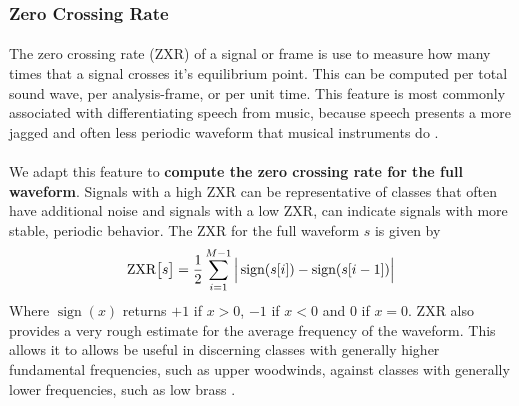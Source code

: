 \documentclass[12pt,letterpaper]{article}
\DeclareMathOperator{\sign}{\text{sign}}
\begin{document}

\subsubsection{Zero Crossing Rate}

\paragraph*{}The zero crossing rate (ZXR) of a signal or frame is use to measure how many times that a signal crosses it's equilibrium point. This can be computed per total sound wave, per analysis-frame, or per unit time. This feature is most commonly associated with differentiating speech from music, because speech presents a more jagged and often less periodic waveform that musical instruments do \cite{Khan,Liu,Zhang} . 

\paragraph*{}We adapt this feature to \textbf{compute the zero crossing rate for the full waveform}. Signals with a high ZXR can be representative of classes that often have additional noise and signals with a low ZXR, can indicate signals with more stable, periodic behavior. The ZXR for the full waveform $s$ is given by \cite{Serizel,Liu}
\begin{equation}
\label{eqn-ZXR}
\text{ZXR}\big[ s \big] = \frac{1}{2} \sum_{i=1}^{M-1} \Big{|} \sign(s[i]) - \sign(s[i-1]) \Big{|} 
\end{equation}
Where $\sign(x)$ returns $+1$ if $x > 0$, $-1$ if $x < 0$ and $0$ if $x = 0$. ZXR also provides a very rough estimate for the average frequency of the waveform. This allows it to allows be useful in discerning classes with generally higher fundamental frequencies, such as upper woodwinds, against classes with generally lower frequencies, such as low brass \cite{Liu,White}.
\end{document}
